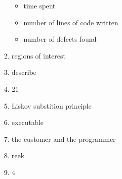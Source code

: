 \documentclass{exam}
\begin{document}
\begin{enumerate}
\begin{itemize}
\item time spent
\item number of lines of code written
\item number of defects found
\end{itemize}
\item regions of interest
\item describe
\item 21
\item Liskov substition principle
\item executable
\item the customer and the programmer
\item reek
\item 4
\end{enumerate}
\end{document}
